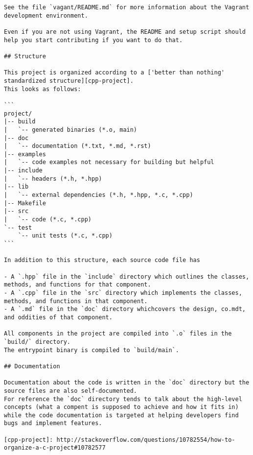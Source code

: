 \begin{lstlisting}[caption={Documentation about the transformer as a whole.}]
See the file `vagant/README.md` for more information about the Vagrant development environment.

Even if you are not using Vagrant, the README and setup script should help you start contributing if you want to do that.

## Structure

This project is organized according to a ['better than nothing' standardized structure][cpp-project].
This looks as follows:

```
project/
|-- build
|   `-- generated binaries (*.o, main)
|-- doc
|   `-- documentation (*.txt, *.md, *.rst)
|-- examples
|   `-- code examples not necessary for building but helpful
|-- include
|   `-- headers (*.h, *.hpp)
|-- lib
|   `-- external dependencies (*.h, *.hpp, *.c, *.cpp)
|-- Makefile
|-- src
|   `-- code (*.c, *.cpp)
`-- test
    `-- unit tests (*.c, *.cpp)
```

In addition to this structure, each source code file has

- A `.hpp` file in the `include` directory which outlines the classes, methods, and functions for that component.
- A `.cpp` file in the `src` directory which implements the classes, methods, and functions in that component.
- A `.md` file in the `doc` directory whichcovers the design, co.mdt, and oddities of that component.

All components in the project are compiled into `.o` files in the `build/` directory.
The entrypoint binary is compiled to `build/main`.

## Documentation

Documentation about the code is written in the `doc` directory but the source files are also self-documented.
For reference the `doc` directory tends to talk about the high-level concepts (what a compent is supposed to achieve and how it fits in) while the code documentation is targeted at helping developers find bugs and implement features.

[cpp-project]: http://stackoverflow.com/questions/10782554/how-to-organize-a-c-project#10782577
\end{lstlisting}
